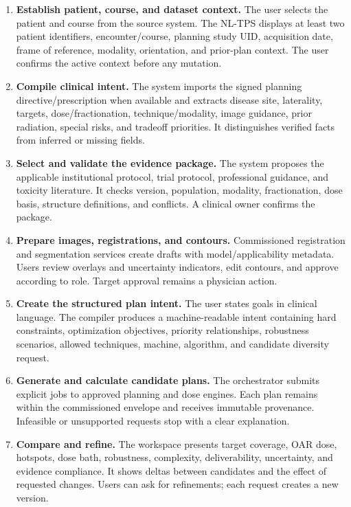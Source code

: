 \documentclass[11pt,letterpaper]{article}
\begin{document}
\begin{enumerate}
\item \textbf{Establish patient, course, and dataset context.} The user selects the patient and course from the source system. The NL-TPS displays at least two patient identifiers, encounter\slash\allowbreak{}course, planning study UID, acquisition date, frame of reference, modality, orientation, and prior-plan context. The user confirms the active context before any mutation.
\item \textbf{Compile clinical intent.} The system imports the signed planning directive\slash\allowbreak{}prescription when available and extracts disease site, laterality, targets, dose\slash\allowbreak{}fractionation, technique\slash\allowbreak{}modality, image guidance, prior radiation, special risks, and tradeoff priorities. It distinguishes verified facts from inferred or missing fields.
\item \textbf{Select and validate the evidence package.} The system proposes the applicable institutional protocol, trial protocol, professional guidance, and toxicity literature. It checks version, population, modality, fractionation, dose basis, structure definitions, and conflicts. A clinical owner confirms the package.
\item \textbf{Prepare images, registrations, and contours.} Commissioned registration and segmentation services create drafts with model\slash\allowbreak{}applicability metadata. Users review overlays and uncertainty indicators, edit contours, and approve according to role. Target approval remains a physician action.
\item \textbf{Create the structured plan intent.} The user states goals in clinical language. The compiler produces a machine-readable intent containing hard constraints, optimization objectives, priority relationships, robustness scenarios, allowed techniques, machine, algorithm, and candidate diversity request.
\item \textbf{Generate and calculate candidate plans.} The orchestrator submits explicit jobs to approved planning and dose engines. Each plan remains within the commissioned envelope and receives immutable provenance. Infeasible or unsupported requests stop with a clear explanation.
\item \textbf{Compare and refine.} The workspace presents target coverage, OAR dose, hotspots, dose bath, robustness, complexity, deliverability, uncertainty, and evidence compliance. It shows deltas between candidates and the effect of requested changes. Users can ask for refinements; each request creates a new version.

\end{enumerate}
\end{document}
